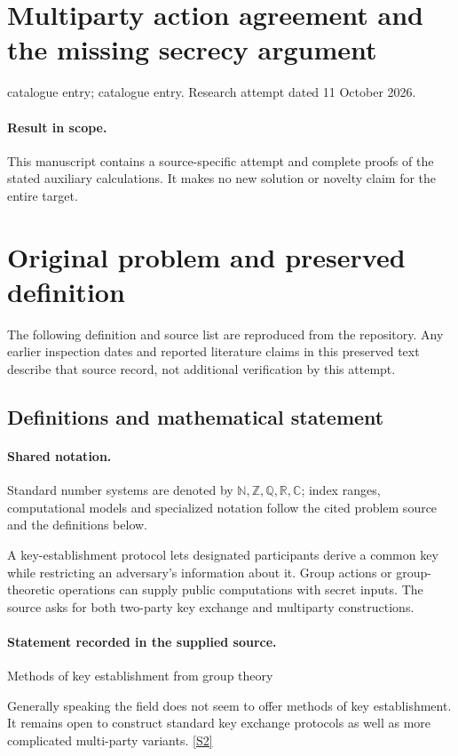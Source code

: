 \documentclass[11pt]{article}
\begin{document}
\section*{Multiparty action agreement and the missing secrecy argument}
\noindent catalogue entry; catalogue entry. Research attempt dated 11 October 2026.
\paragraph{Result in scope.}This manuscript contains a source-specific attempt and complete proofs of the stated auxiliary calculations. It makes no new solution or novelty claim for the entire target.
\section{Original problem and preserved definition}
The following definition and source list are reproduced from the repository. Any earlier inspection dates and reported literature claims in this preserved text describe that source record, not additional verification by this attempt.
\subsection{Definitions and mathematical statement}

\paragraph{Shared notation.}Standard number systems are denoted by $\mathbb N,\mathbb Z,\mathbb Q,\mathbb R,\mathbb C$; index ranges, computational models and specialized notation follow the cited problem source and the definitions below.


A key-establishment protocol lets designated participants derive a common key while restricting an adversary's information about it. Group actions or group-theoretic operations can supply public computations with secret inputs. The source asks for both two-party key exchange and multiparty constructions.
\paragraph{Statement recorded in the supplied source.}
Methods of key establishment from group theory

Generally speaking the field does not seem to offer methods of key establishment. It remains open to construct standard key exchange protocols as well as more complicated multi-party variants. \href{http://aimpl.org/postquantgroup/2/}{[S2]}
\end{document}
